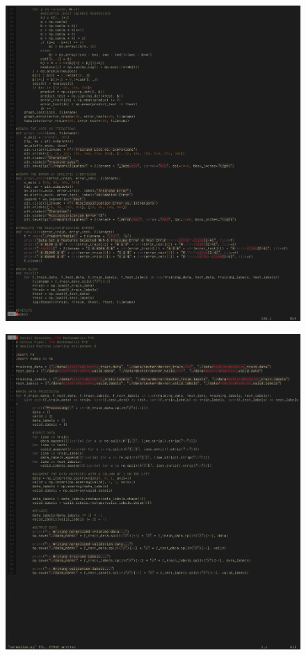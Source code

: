 \documentclass[UTF8]{article}
\begin{document}
\begin{figure}[H]
    \centering
    \includegraphics[scale=0.7]{./figures/code2.png}
\end{figure}
\begin{figure}[H]
    \centering
    \includegraphics[scale=0.7]{./figures/code-norm.png}
\end{figure}
\end{document}

